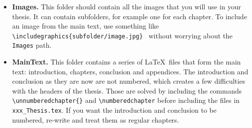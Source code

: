 \begin{itemize}

\item \textbf{Images.} This folder should contain all the images that you will use in your thesis. It can contain subfolders, for example one for each chapter. To include an image from the main text, use something like \texttt{\textbackslash includegraphics\{subfolder/image.jpg\} } without worrying about the \texttt{Images} path.

\item \textbf{MainText.} This folder contains a series of \LaTeX\ files that form the main text: introduction, chapters, conclusion and appendices. The introduction and conclusion as they are now are not numbered, which creates a few difficulties with the headers of the thesis. Those are solved by including the commands \texttt{\textbackslash unnumberedchapter\{\}} and \texttt{\textbackslash numberedchapter} before including the files in \texttt{xxx\_Thesis.tex}. If you want the introduction and conclusion to be numbered, re-write and treat them as regular chapters.


\end{itemize}
